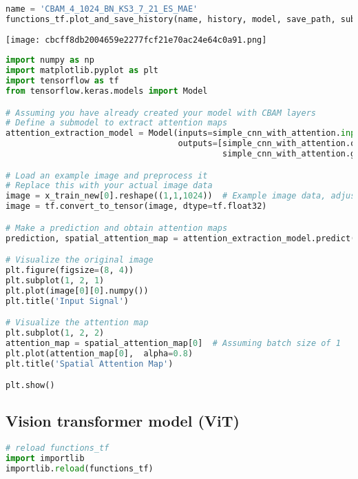 \begin{lstlisting}[language=Python]
name = 'CBAM_4_1024_BN_KS3_7_21_ES_MAE'
functions_tf.plot_and_save_history(name, history, model, save_path, subfolder=subfolder, plot_acc=False)
\end{lstlisting}

\texttt{[image: cbcff8db2004659e2277fcf21e70ac24e64c0a91.png]}

\begin{lstlisting}[language=Python]
import numpy as np
import matplotlib.pyplot as plt
import tensorflow as tf
from tensorflow.keras.models import Model

# Assuming you have already created your model with CBAM layers
# Define a submodel to extract attention maps
attention_extraction_model = Model(inputs=simple_cnn_with_attention.input,
                                   outputs=[simple_cnn_with_attention.output,
                                            simple_cnn_with_attention.get_layer('spatial_attention_80').output])

# Load an example image and preprocess it
# Replace this with your actual image data
image = x_train_new[0].reshape((1,1,1024))  # Example image data, adjust shape and values as needed
image = tf.convert_to_tensor(image, dtype=tf.float32)

# Make a prediction and obtain attention maps
prediction, spatial_attention_map = attention_extraction_model.predict(image)

# Visualize the original image
plt.figure(figsize=(8, 4))
plt.subplot(1, 2, 1)
plt.plot(image[0][0].numpy())
plt.title('Input Signal')

# Visualize the attention map
plt.subplot(1, 2, 2)
attention_map = spatial_attention_map[0]  # Assuming batch size of 1
plt.plot(attention_map[0],  alpha=0.8)
plt.title('Spatial Attention Map')

plt.show()
\end{lstlisting}

\hypertarget{vision-transformer-model-vit}{%
\subsection{Vision transformer model
(ViT)}\label{vision-transformer-model-vit}}

\begin{lstlisting}[language=Python]
# reload functions_tf
import importlib
importlib.reload(functions_tf)
\end{lstlisting}

